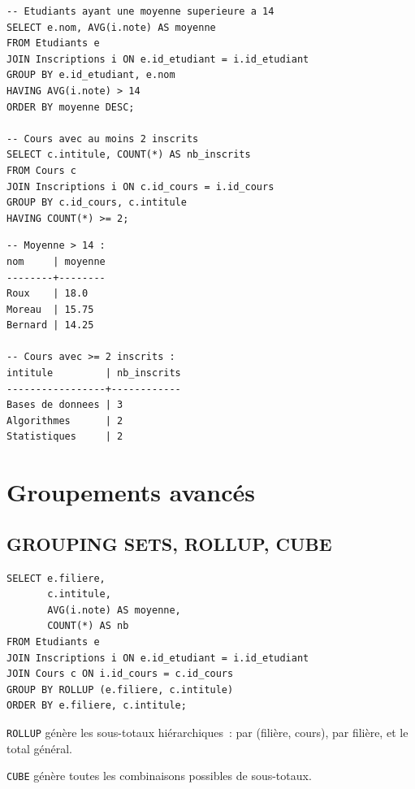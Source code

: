 \begin{codeblock}[title=\textbf{Filtrage avec HAVING}]
\begin{verbatim}
-- Etudiants ayant une moyenne superieure a 14
SELECT e.nom, AVG(i.note) AS moyenne
FROM Etudiants e
JOIN Inscriptions i ON e.id_etudiant = i.id_etudiant
GROUP BY e.id_etudiant, e.nom
HAVING AVG(i.note) > 14
ORDER BY moyenne DESC;

-- Cours avec au moins 2 inscrits
SELECT c.intitule, COUNT(*) AS nb_inscrits
FROM Cours c
JOIN Inscriptions i ON c.id_cours = i.id_cours
GROUP BY c.id_cours, c.intitule
HAVING COUNT(*) >= 2;
\end{verbatim}
\end{codeblock}

\begin{codeoutput}
\begin{verbatim}
-- Moyenne > 14 :
nom     | moyenne
--------+--------
Roux    | 18.0
Moreau  | 15.75
Bernard | 14.25

-- Cours avec >= 2 inscrits :
intitule         | nb_inscrits
-----------------+------------
Bases de donnees | 3
Algorithmes      | 2
Statistiques     | 2
\end{verbatim}
\end{codeoutput}

\section{Groupements avanc\'es}

\subsection{GROUPING SETS, ROLLUP, CUBE}

\begin{codeblock}[title=\textbf{ROLLUP --- sous-totaux hi\'erarchiques (PostgreSQL)}]
\begin{verbatim}
SELECT e.filiere,
       c.intitule,
       AVG(i.note) AS moyenne,
       COUNT(*) AS nb
FROM Etudiants e
JOIN Inscriptions i ON e.id_etudiant = i.id_etudiant
JOIN Cours c ON i.id_cours = c.id_cours
GROUP BY ROLLUP (e.filiere, c.intitule)
ORDER BY e.filiere, c.intitule;
\end{verbatim}
\end{codeblock}

\texttt{ROLLUP} g\'en\`ere les sous-totaux hi\'erarchiques~: par (fili\`ere, cours),
par fili\`ere, et le total g\'en\'eral.

\texttt{CUBE} g\'en\`ere toutes les combinaisons possibles de sous-totaux.

